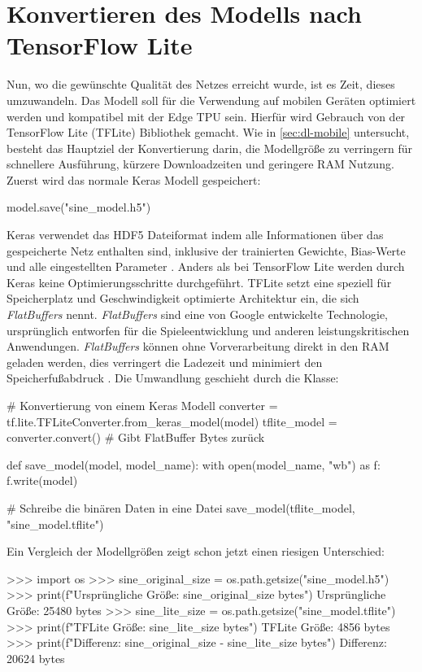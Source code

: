 \section{Konvertieren des Modells nach TensorFlow Lite}
\label{sec:convert-model}
Nun, wo die gewünschte Qualität des Netzes erreicht
wurde, ist es Zeit, dieses umzuwandeln.
Das Modell soll für die Verwendung auf mobilen Geräten optimiert werden
und kompatibel mit der Edge TPU sein.
Hierfür wird Gebrauch von der TensorFlow Lite (TFLite) Bibliothek gemacht.
Wie in \autoref{sec:dl-mobile} untersucht,
besteht das Hauptziel der Konvertierung darin, die Modellgröße zu verringern
für schnellere Ausführung, kürzere Downloadzeiten und geringere RAM Nutzung.
Zuerst wird das normale Keras Modell gespeichert:
\begin{pythoncode}
model.save("sine_model.h5")
\end{pythoncode}
Keras verwendet das HDF5 Dateiformat
indem alle Informationen über das gespeicherte Netz enthalten sind,
inklusive der trainierten Gewichte, Bias-Werte und alle eingestellten
Parameter \parencite[314]{book:hands-on-ml}.
Anders als bei TensorFlow Lite werden durch Keras keine Optimierungsschritte
durchgeführt.
TFLite setzt eine speziell für Speicherplatz und Geschwindigkeit
optimierte Architektur ein,
die sich \textit{FlatBuffers} nennt.
\textit{FlatBuffers} sind eine von Google
entwickelte Technologie, ursprünglich entworfen für die Spieleentwicklung
und anderen leistungskritischen Anwendungen.
\textit{FlatBuffers} können ohne Vorverarbeitung direkt in den RAM
geladen werden, dies verringert die Ladezeit
und minimiert den Speicherfußabdruck \parencite[685]{book:hands-on-ml}.
Die Umwandlung geschieht durch die
 Klasse:
\begin{pythoncode}
# Konvertierung von einem Keras Modell
converter = tf.lite.TFLiteConverter.from_keras_model(model)
tflite_model = converter.convert() # Gibt FlatBuffer Bytes zurück

def save_model(model, model_name):
    with open(model_name, "wb") as f:
        f.write(model)

# Schreibe die binären Daten in eine Datei
save_model(tflite_model, "sine_model.tflite")
\end{pythoncode}
Ein Vergleich der Modellgrößen zeigt schon jetzt einen riesigen Unterschied:
\begin{pyconcode}
>>> import os
>>> sine_original_size = os.path.getsize("sine_model.h5")
>>> print(f"Ursprüngliche Größe: {sine_original_size} bytes")
Ursprüngliche Größe: 25480 bytes
>>> sine_lite_size = os.path.getsize("sine_model.tflite")
>>> print(f"TFLite Größe: {sine_lite_size} bytes")
TFLite Größe: 4856 bytes
>>> print(f"Differenz: {sine_original_size - sine_lite_size} bytes")
Differenz: 20624 bytes
\end{pyconcode}
